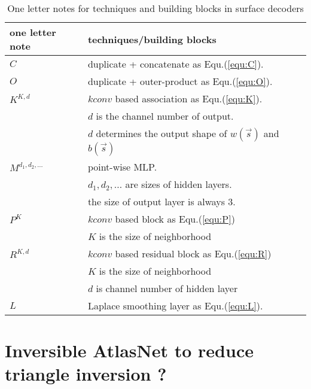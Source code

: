 \begin{table}
	\caption{One letter notes for techniques and building blocks in surface decoders}
	\label{tab:note}
	\centering
	\begin{tabular}{l | l }
	one letter note & techniques/building blocks\\
	\hline
	$C$ & duplicate + concatenate as Equ.(\ref{equ:C}).\\
	$O$ & duplicate + outer-product as Equ.(\ref{equ:O}).\\
	$K^{K,d}$ & $kconv$ based association as Equ.(\ref{equ:K}).\\
		     ~& $d$ is the channel number of output.\\
		     & $d$ determines the output shape of $w(\vec{s})$ and $b(\vec{s})$\\
	$M^{d_1,d_2,\dots}$ & point-wise MLP.\\
					   ~& $d_1,d_2,\dots$ are sizes of hidden layers.\\
					   ~& the size of output layer is always 3.\\
	$P^{K}$			    & $kconv$ based block as Equ.(\ref{equ:P}) \\
					   ~& $K$ is the size of neighborhood\\
	$R^{K,d}$           & $kconv$ based residual block as Equ.(\ref{equ:R})\\
					   ~& $K$ is the size of neighborhood\\ 
					   ~& $d$ is channel number of hidden layer\\
	$L$                 & Laplace smoothing layer as Equ.(\ref{equ:L}).\\
	\end{tabular}	
\end{table}

\section{Inversible AtlasNet to reduce triangle inversion ?}
